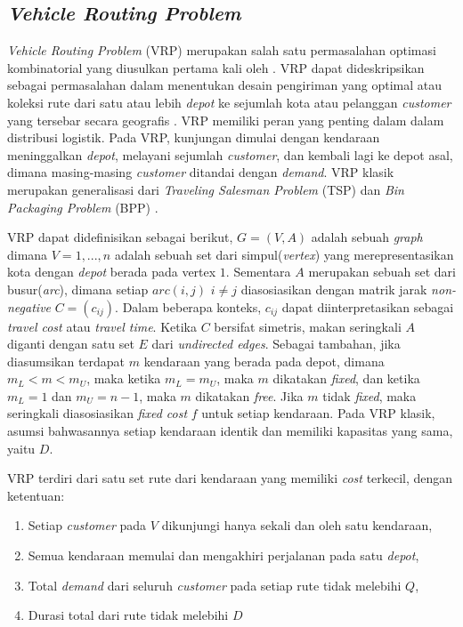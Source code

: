 \subsection{\textit{Vehicle Routing Problem}}
\label{ssec:vrp}
\textit{Vehicle Routing Problem} (VRP) merupakan salah satu permasalahan optimasi kombinatorial yang diusulkan pertama kali oleh \citep{dantzig_truck_1959}. VRP dapat dideskripsikan sebagai permasalahan dalam menentukan desain pengiriman yang optimal atau koleksi rute dari satu atau lebih \textit{depot} ke sejumlah kota atau pelanggan \textit{customer} yang tersebar secara geografis \citep{laporte_vehicle_1992}. VRP memiliki peran yang penting dalam dalam distribusi logistik. Pada VRP, kunjungan dimulai dengan kendaraan meninggalkan \textit{depot}, melayani sejumlah \textit{customer}, dan kembali lagi ke depot asal, dimana masing-masing \textit{customer} ditandai dengan \textit{demand}. VRP klasik merupakan generalisasi dari \textit{Traveling Salesman Problem} (TSP) dan \textit{Bin Packaging Problem} (BPP) \citep{garey_computers_2002}.


VRP dapat didefinisikan sebagai berikut, $G = (V, A)$ adalah sebuah \textit{graph} dimana $V = {1,...,n}$ adalah sebuah set dari simpul(\textit{vertex}) yang merepresentasikan kota dengan \textit{depot} berada pada vertex $1$. Sementara $A$ merupakan sebuah set dari busur(\textit{arc}), dimana setiap $arc(i, j)$ $i \neq j$ diasosiasikan dengan matrik jarak \textit{non-negative} $C = (c_{ij})$. Dalam beberapa konteks, $c_{ij}$ dapat diinterpretasikan sebagai \textit{travel cost} atau \textit{travel time}. Ketika $C$ bersifat simetris, makan seringkali $A$ diganti dengan satu set $E$ dari \textit{undirected edges}. Sebagai tambahan, jika diasumsikan terdapat $m$ kendaraan yang berada pada depot, dimana $m_L < m < m_U$, maka ketika $m_L = m_U$, maka $m$ dikatakan \textit{fixed}, dan ketika $m_L = 1$ dan $m_U = n - 1$, maka $m$ dikatakan \textit{free}. Jika $m$ tidak \textit{fixed}, maka seringkali diasosiasikan \textit{fixed cost} $f$ untuk setiap kendaraan. Pada VRP klasik, asumsi bahwasannya setiap kendaraan identik dan memiliki kapasitas yang sama, yaitu $D$.


VRP terdiri dari satu set rute dari kendaraan yang memiliki \textit{cost} terkecil, dengan ketentuan:
\begin{enumerate}
\item Setiap \textit{customer} pada $V$ dikunjungi hanya sekali dan oleh satu kendaraan, 
\item Semua kendaraan memulai dan mengakhiri perjalanan pada satu \textit{depot}, 
\item Total \textit{demand} dari seluruh \textit{customer} pada setiap rute tidak melebihi $Q$, 
\item Durasi total dari rute tidak melebihi $D$
\end{enumerate}


